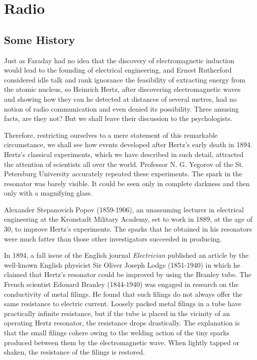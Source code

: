 

\cleardoublepage
\chapter{Radio}
\label{ch-06}

\section{Some History}

Just as Faraday had no idea that the discovery of electromagnetic induction would lead to the founding of electrical engineering, and Ernest Rutherford considered idle talk and rank ignorance the feasibility of extracting energy from the atomic nucleus, so Heinrich Hertz, after discovering electromagnetic waves and showing how they can he detected at distances of several metres, had no notion of radio communication and even denied its possibility. Three amusing facts, are they not? But we shall leave their discussion to the psychologists.


Therefore, restricting ourselves to a mere statement of this remarkable circumstance, we shall see how events developed after Hertz's early death in 1894.
Hertz's classical experiments, which we have described in such detail, attracted the attention of scientists all over the world. Professor N. G. Yegorov of the St. Petersburg University accurately repeated these experiments. The spark in the resonator was barely visible. It could be seen only in complete darkness and then only with a magnifying glass.

Alexander Stepanovich Popov (1859-1906), an unassuming lecturer in electrical engineering at the Kronstadt Military Academy, set to work in 1889, at the age of 30, to improve Hertz's experiments. The sparks that he obtained in his resonators were much fatter than those other investigators succeeded in producing.

In 1894, a fall issue of the English journal \emph{Electrician} published an article by the well-known English physicist Sir Oliver Joseph Lodge (1851-1940) in which he claimed that Hertz's resonator could be improved by using the Branley tube. The French scientist Edouard Branley (1844-1940) was engaged in research on the conductivity of metal filings. He found that such filings do not always offer the same resistance to electric current. Loosely packed metal filings in a tube have practically infinite resistance, but if the tube is placed in the vicinity of an operating Hertz resonator, the resistance drops drastically. The explanation is that the small filings cohere owing to the welding action of the tiny sparks produced between them by the electromagnetic wave. When lightly tapped or shaken, the resistance of the filings is restored.

